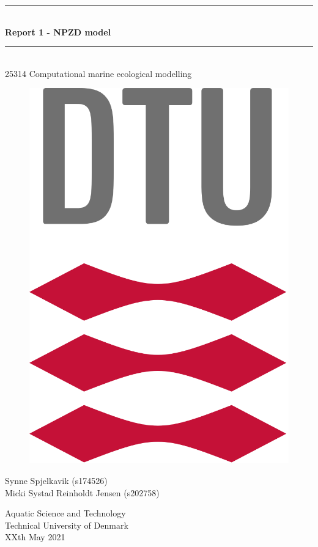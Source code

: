 \begin{titlepage}
\centering \parindent=0pt
\newcommand{\HRule}{\rule{\textwidth}{0.1mm}}
 \HRule\\[0.1cm]\huge\bfseries
Report 1 - NPZD model
\HRule\\[0.5cm]

\Large 25314 Computational marine ecological modelling \\[2.5cm]
\begin{figure}[H]
  \centering
    \includegraphics[scale=0.20]{Figures/uni-logo.png}
    \label{fig:forside}
\end{figure}
\vspace*{\fill}
Synne Spjelkavik (s174526)\\
Micki Systad Reinholdt Jensen (s202758)\\
\vspace*{\fill}

\begin{flushleft}
\normalsize
Aquatic Science and Technology\\
Technical University of Denmark\\
XXth May 2021\\
\end{flushleft}
\end{titlepage}